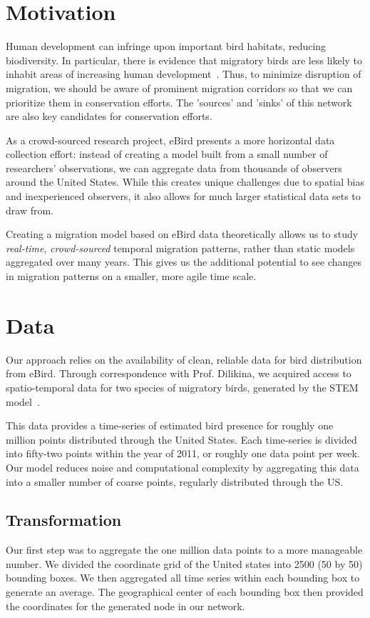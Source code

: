 \documentclass{article} %
\begin{document}
\section{Motivation}
Human development can infringe upon important bird habitats, reducing biodiversity. In particular, there is evidence that migratory birds are less likely to inhabit areas of increasing human development~\cite{riparian}. Thus, to minimize disruption of migration, we should be aware of prominent migration corridors so that we can prioritize them in conservation efforts. The 'sources' and 'sinks' of this network are also key candidates for conservation efforts.

As a crowd-sourced research project, eBird presents a more horizontal data collection effort: instead of creating a model built from a small number of researchers' observations, we can aggregate data from thousands of observers around the United States. While this creates unique challenges due to spatial bias and inexperienced observers, it also allows for much larger statistical data sets to draw from. 

Creating a migration model based on eBird data theoretically allows us to study \textit{real-time}, \textit{crowd-sourced} temporal migration patterns, rather than static models aggregated over many years. This gives us the additional potential to see changes in migration patterns on a smaller, more agile time scale.

\section{Data}
Our approach relies on the availability of clean, reliable data for bird distribution from eBird. Through correspondence with Prof. Dilikina, we acquired access to spatio-temporal data for two species of migratory birds, generated by the STEM model~\cite{stem}. 

This data provides a time-series of estimated bird presence for roughly one million points distributed through the United States. Each time-series is divided into fifty-two points within the year of 2011, or roughly one data point per week. Our model reduces noise and computational complexity by aggregating this data into a smaller number of coarse points, regularly distributed through the US. 

\subsection{Transformation}
Our first step was to aggregate the one million data points to a more manageable number. We divided the coordinate grid of the United states into 2500 (50 by 50) bounding boxes. We then aggregated all time series within each bounding box to generate an average. The geographical center of each bounding box then provided the coordinates for the generated node in our network. 
\end{document}
